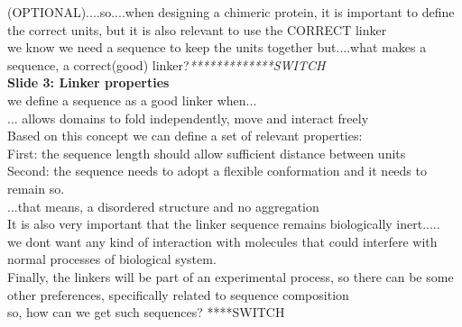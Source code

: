 \documentclass[a4paper,10pt]{article}
\begin{document}
(OPTIONAL)....so....when designing a chimeric protein, it is important to define the correct units, but it is also relevant to use the CORRECT linker \\
we know we need a sequence to keep the units together but....what makes a sequence, a correct(good) linker?\textit{*************SWITCH } \\






\textbf{Slide 3: Linker properties}\\
we define a sequence as a good linker when...\\
... allows domains to fold independently, move and interact freely\\
Based on this concept we can define a set of relevant properties:\\
First: the sequence length should allow sufficient distance between units\\
Second: the sequence needs to adopt a flexible conformation and it needs to remain so.\\
...that means, a disordered structure and no aggregation\\
It is also very important that the linker sequence remains biologically inert.....\\
we dont want any kind of interaction with molecules that could interfere with normal processes of biological system.\\
Finally, the linkers will be part of an experimental process, so there can be some other preferences, specifically related to sequence composition \\
so, how can we get such sequences? ****SWITCH\\
\end{document}
